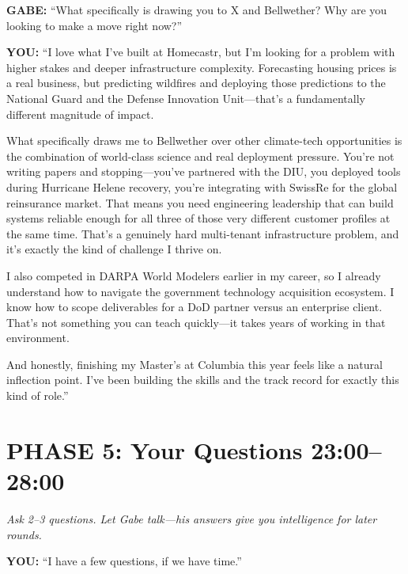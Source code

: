 \documentclass[11pt,letterpaper]{article}
\newenvironment{gabe}{\begin{mdframed}[backgroundcolor=gabebg,linewidth=0pt,innertopmargin=8pt,innerbottommargin=8pt]\textbf{\color{xred}GABE:} }{\end{mdframed}}
\newenvironment{you}{\begin{mdframed}[backgroundcolor=youbg,linewidth=0pt,innertopmargin=8pt,innerbottommargin=8pt]\textbf{\color{xblue}YOU:} }{\end{mdframed}}
\newcommand{\stage}[1]{{\small\color{xgray}\textit{#1}}}
\begin{document}
\begin{gabe}
``What specifically is drawing you to X and Bellwether? Why are you looking to make a move right now?''
\end{gabe}

\begin{you}
``I love what I've built at Homecastr, but I'm looking for a problem with higher stakes and deeper infrastructure complexity. Forecasting housing prices is a real business, but predicting wildfires and deploying those predictions to the National Guard and the Defense Innovation Unit---that's a fundamentally different magnitude of impact.

What specifically draws me to Bellwether over other climate-tech opportunities is the combination of world-class science and real deployment pressure. You're not writing papers and stopping---you've partnered with the DIU, you deployed tools during Hurricane Helene recovery, you're integrating with SwissRe for the global reinsurance market. That means you need engineering leadership that can build systems reliable enough for all three of those very different customer profiles at the same time. That's a genuinely hard multi-tenant infrastructure problem, and it's exactly the kind of challenge I thrive on.

I also competed in DARPA World Modelers earlier in my career, so I already understand how to navigate the government technology acquisition ecosystem. I know how to scope deliverables for a DoD partner versus an enterprise client. That's not something you can teach quickly---it takes years of working in that environment.

And honestly, finishing my Master's at Columbia this year feels like a natural inflection point. I've been building the skills and the track record for exactly this kind of role.''
\end{you}

\section*{PHASE 5: Your Questions \hfill {\color{xgray}\normalsize 23:00--28:00}}

\stage{Ask 2--3 questions. Let Gabe talk---his answers give you intelligence for later rounds.}

\begin{you}
``I have a few questions, if we have time.''
\end{you}
\end{document}

